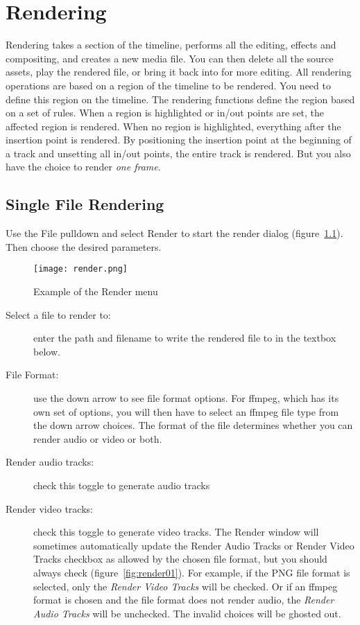 \chapter{Rendering}%
\label{cha:rendering}

Rendering takes a section of the timeline, performs all the editing, effects and compositing, and creates a new media file.  You can then delete all the source assets, play the rendered file, or bring it back into \CGG{} for more editing.   All rendering operations are based on a region of the timeline to be rendered.  You need to define this region on the timeline.  The rendering functions define the region based on a set of rules.  When a region is highlighted or in/out points are set, the affected region is rendered.  When no region is highlighted, everything after the insertion point is rendered.  By
positioning the insertion point at the beginning of a track and unsetting all in/out points, the entire track is rendered.  But you also have the choice to render \textit{one frame}.

\section{Single File Rendering}%
\label{sec:single_file_rendering}

Use the File pulldown and select Render to start the render dialog (figure~\ref{fig:render}).  Then choose the desired parameters.

\begin{figure}[htpb]
    \centering
    \texttt{[image: render.png]}
    \caption{Example of the Render menu}
    \label{fig:render}
\end{figure}

\begin{description}
    \item[Select a file to render to:] enter the path and filename to write the rendered file to in the textbox below.
    \item[File Format:] use the down arrow to see file format options.  For ffmpeg, which has its own set of options, you will then have to select an ffmpeg file type from the down arrow choices. The format of the file determines whether you can render audio or video or both.
    \item[Render audio tracks:] check this toggle to generate audio tracks
    \item[Render video tracks:] check this toggle to generate video tracks. The Render window will sometimes automatically update the Render Audio Tracks or Render Video Tracks checkbox as allowed by the chosen file format, but you should always check (figure~\ref{fig:render01}).  For example, if the PNG file format is selected, only the \textit{Render Video Tracks} will be checked.  Or if an ffmpeg format is chosen and the file format does not render audio, the \textit{Render Audio Tracks} will be unchecked. The invalid choices will be ghosted out.
\end{description}

